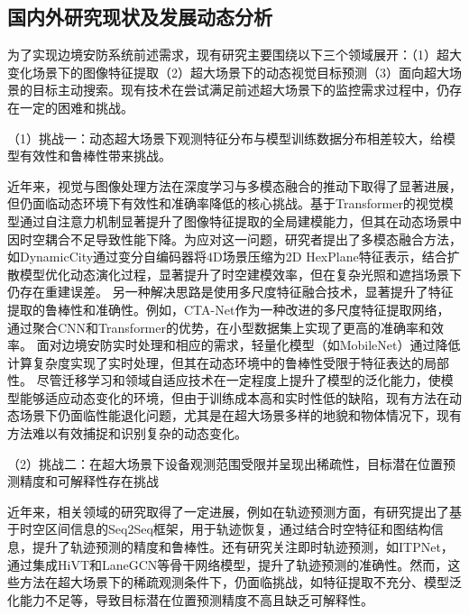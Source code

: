 \subsection{国内外研究现状及发展动态分析}

为了实现边境安防系统前述需求，现有研究主要围绕以下三个领域展开：（1）超大变化场景下的图像特征提取（2）超大场景下的动态视觉目标预测（3）面向超大场景的目标主动搜索。现有技术在尝试满足前述超大场景下的监控需求过程中，仍存在一定的困难和挑战。

（1）挑战一：动态超大场景下观测特征分布与模型训练数据分布相差较大，给模型有效性和鲁棒性带来挑战。


近年来，视觉与图像处理方法在深度学习与多模态融合的推动下取得了显著进展，但仍面临动态环境下有效性和准确率降低的核心挑战。基于Transformer的视觉模型\cite{dosovitskiy2020image,carion2020end,liu2021swin,zhu2021deformable,zheng2021rethinking,bao2021beit,he2021masked,liu2021tokens,wang2021pyramid}通过自注意力机制显著提升了图像特征提取的全局建模能力，但其在动态场景中因时空耦合不足导致性能下降。为应对这一问题，研究者提出了多模态融合方法，如DynamicCity\cite{dynamiccity2025}通过变分自编码器将4D场景压缩为2D HexPlane特征表示，结合扩散模型优化动态演化过程，显著提升了时空建模效率，但在复杂光照和遮挡场景下仍存在重建误差。
另一种解决思路是使用多尺度特征融合技术，显著提升了特征提取的鲁棒性和准确性。例如，CTA-Net\cite{Meng2024CTA-Net}作为一种改进的多尺度特征提取网络，通过聚合CNN和Transformer的优势，在小型数据集上实现了更高的准确率和效率。
面对边境安防实时处理和相应的需求，轻量化模型（如MobileNet\cite{sandler2018mobilenetv2,howard2019searching}）通过降低计算复杂度实现了实时处理，但其在动态环境中的鲁棒性受限于特征表达的局部性。
尽管迁移学习和领域自适应技术在一定程度上提升了模型的泛化能力，使模型能够适应动态变化的环境，但由于训练成本高和实时性低的缺陷，现有方法在动态场景下仍面临性能退化问题，尤其是在超大场景多样的地貌和物体情况下，现有方法难以有效捕捉和识别复杂的动态变化。

（2）挑战二：在超大场景下设备观测范围受限并呈现出稀疏性，目标潜在位置预测精度和可解释性存在挑战

近年来，相关领域的研究取得了一定进展，例如在轨迹预测方面，有研究提出了基于时空区间信息的Seq2Seq\cite{Seq2SeqTrajRec}框架，用于轨迹恢复，通过结合时空特征和图结构信息，提升了轨迹预测的精度和鲁棒性。还有研究关注即时轨迹预测，如ITPNet\cite{ITPNet}，通过集成HiVT\cite{zhou2022hivt}和LaneGCN\cite{liang2020learning}等骨干网络模型，提升了轨迹预测的准确性。然而，这些方法在超大场景下的稀疏观测条件下，仍面临挑战，如特征提取不充分、模型泛化能力不足等，导致目标潜在位置预测精度不高且缺乏可解释性。

